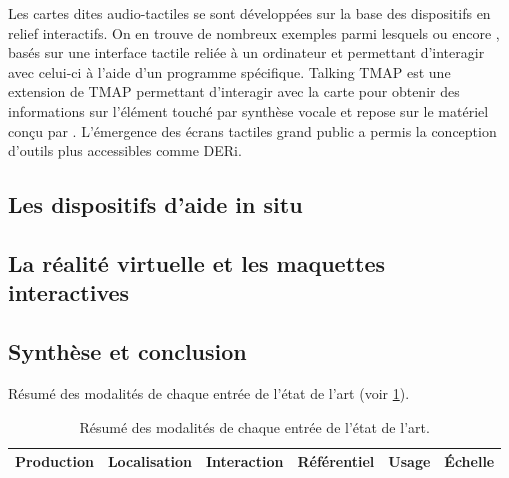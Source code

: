 Les cartes dites audio-tactiles se sont développées sur la base des dispositifs en relief interactifs. On en trouve de nombreux exemples parmi lesquels \cite{Loetzsch1994} ou encore \cite{Landau2001}, basés sur une interface tactile reliée à un ordinateur et permettant d'interagir avec celui-ci à l'aide d'un programme spécifique.
Talking TMAP \cite{Miele2006} est une extension de TMAP \cite{Miele2004} permettant d'interagir avec la carte pour obtenir des informations sur l'élément touché par synthèse vocale et repose sur le matériel conçu par \cite{Landau2001}. L'émergence des écrans tactiles grand public a permis la conception d'outils plus accessibles \cite{Brock2015} comme DERi.

\subsection{Les dispositifs d'aide in situ}




\todo{}

\subsection{La réalité virtuelle et les maquettes interactives}


\todo{}

\subsection{Synthèse et conclusion}


Résumé des modalités de chaque entrée de l'état de l'art (voir \ref{tab:ea_resume}).

\begin{table}
\begin{center}
\scriptsize
\begin{tabular}{ | l | l | l | l | l | l | }
    Production & Localisation & Interaction & Référentiel & Usage & Échelle \tabularnewline
    \hline
\end{tabular}
\end{center}
\caption{Résumé des modalités de chaque entrée de l'état de l'art.}
\label{tab:ea_resume}
\end{table}

\todo{}